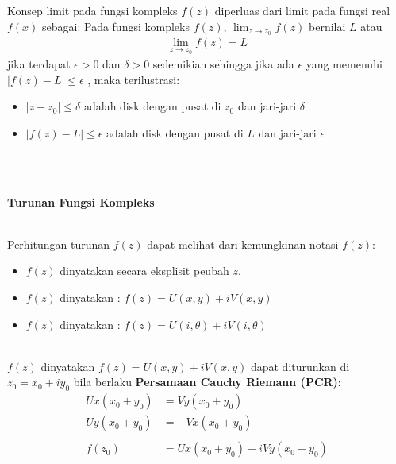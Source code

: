 \documentclass{article}
\begin{document}
Konsep limit pada fungsi kompleks $f(z)$ diperluas dari limit pada fungsi real $f(x)$ sebagai:
Pada fungsi kompleks $f(z)$, $\lim_{z \to z_0} f(z)$ bernilai $L$ atau
\begin{align}
    \boxed{\lim_{z \to z_0} f(z) = L}
    \nonumber
\end{align}
jika terdapat $\epsilon  > 0$ dan $\delta  > 0$ sedemikian sehingga jika ada $\epsilon$ yang memenuhi $|f(z) - L| \leq \epsilon$ , maka terilustrasi:
\begin{itemize}
    \item $|z - z_0| \leq \delta$ adalah disk dengan pusat di $z_0$ dan jari-jari $\delta$
    \item $|f(z) - L| \leq \epsilon$ adalah disk dengan pusat di $L$ dan jari-jari $\epsilon$
\end{itemize}
\leavevmode\\ \\

\begin{center}
    \textbf{Turunan Fungsi Kompleks}
\end{center}
\leavevmode\\

Perhitungan turunan $f(z)$ dapat melihat dari kemungkinan notasi $f(z)$:
\begin{itemize}
    \item $f(z)$ dinyatakan secara eksplisit peubah $z$.
    \item $f(z)$ dinyatakan : $f(z) = U(x,y) + iV(x,y)$
    \item $f(z)$ dinyatakan : $f(z) = U(i,\theta)+ iV(i,\theta)$
\end{itemize}
\leavevmode\\

$f(z)$ dinyatakan $f(z) = U(x,y) + iV(x,y)$ dapat diturunkan di $z_0 = x_0 + iy_0$ bila berlaku \textbf{Persamaan Cauchy Riemann (PCR)}:\\
\begin{align}
    Ux (x_0 + y_0) & = Vy (x_0 + y_0)
    \nonumber                                            \\
    Uy (x_0 + y_0) & = -Vx (x_0 + y_0)
    \nonumber                                            \\
    \nonumber                                            \\
    f(z_0)         & = Ux (x_0 + y_0) + i Vy (x_0 + y_0)
    \nonumber
\end{align}
\leavevmode\\
\end{document}
